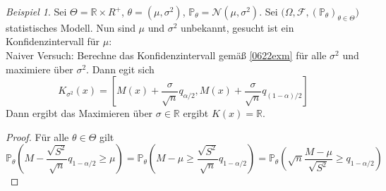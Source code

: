 \documentclass[10pt,a4paper]{article}
\newcommand{\R}{\ensuremath{\mathbb{R}}}
\newcommand{\al}{\ensuremath{\alpha}}
\newcommand{\Prb}{\mathbb P}
\newcommand{\scF}{\ensuremath{\mathscr{F}}}
\newcommand{\Nv}{\mathscr N}
\theoremstyle{plain}
\theoremstyle{definition}
\theoremstyle{remark}
\newtheorem{exm}[theorem]{Beispiel}
\begin{document}
	\begin{exm}
		Sei $\Theta=\R\times R^+$, $\theta=(\mu,\sigma^2)$, $\Prb_\theta=\Nv(\mu,\sigma^2)$. Sei $\big(\Omega,\scF,(\Prb_\theta)_{\theta\in\Theta}\big)$ statistisches Modell. Nun sind $\mu$ und $\sigma^2
		$ unbekannt, gesucht ist ein Konfidenzintervall für $\mu$:\\
		Naiver Versuch: Berechne das Konfidenzintervall gemäß \ref{0622exm} für alle $\sigma^2$ und maximiere über $\sigma^2$. Dann egit sich
		\[K_{\sigma^2}(x)=\left[M(x)+\frac{\sigma}{\sqrt{n}}q_{\al/2},M(x)+\frac{\sigma
		}{\sqrt{n}}q_{(1-\al)/2}\right]\]
		Dann ergibt das Maximieren über $\sigma\in\R$ ergibt $K(x)=\R$.
	\end{exm}
	\begin{proof}
		Für alle $\theta\in\Theta$ gilt
		\[\Prb_\theta\left(M-\frac{\sqrt{S^2}}{\sqrt{n}}q_{1-\al/2}\geq \mu\right)=\Prb_\theta\left(M-\mu\geq \frac{\sqrt{S^2}}{\sqrt{n}}q_{1-\al/2}\right)=\Prb_\theta\left(\sqrt{n}\frac{M-\mu}{\sqrt{S^2}}\geq q_{1-\al/2}\right)\]
	\end{proof}
	
\end{document}
